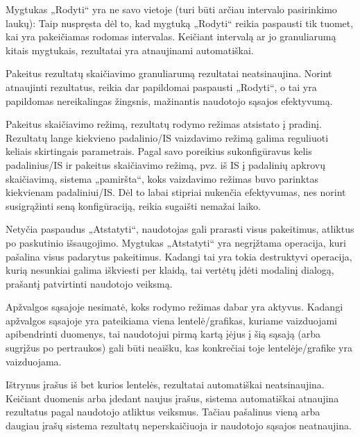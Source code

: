 {
  Mygtukas „Rodyti“ yra ne savo vietoje (turi būti arčiau intervalo
  pasirinkimo laukų):
}
{
  Taip nuspręsta dėl to, kad mygtuką „Rodyti“ reikia paspausti tik tuomet, kai yra
  pakeičiamas rodomas intervalas. Keičiant intervalą ar jo granuliarumą kitais mygtukais,
  rezultatai yra atnaujinami automatiškai.
}

{
  Pakeitus rezultatų skaičiavimo granuliarumą rezultatai neatsinaujina.
}
{
  Norint atnaujinti rezultatus, reikia dar papildomai paspausti „Rodyti“, o tai yra papildomas
  nereikalingas žingsnis, mažinantis naudotojo sąsajos efektyvumą.
}

{
  Pakeitus skaičiavimo režimą, rezultatų rodymo režimas atsistato į pradinį.
}
{
  Rezultatų lange kiekvieno padalinio/IS vaizdavimo režimą galima reguliuoti
  keliais skirtingais parametrais. Pagal savo poreikius sukonfigūravus kelis
  padalinius/IS ir pakeitus skaičiavimo režimą, pvz. iš IS į padalinių
  apkrovų skaičiavimą, sistema „pamiršta“, koks vaizdavimo režimas buvo
  parinktas kiekvienam padaliniui/IS. Dėl to labai stipriai nukenčia
  efektyvumas, nes norint susigrąžinti seną konfigūraciją, reikia sugaišti
  nemažai laiko.
}

{
  Netyčia paspaudus „Atstatyti“, naudotojas gali prarasti visus pakeitimus,
  atliktus po paskutinio išsaugojimo.
}
{
  Mygtukas „Atstatyti“ yra negrįžtama operacija, kuri pašalina visus
  padarytus pakeitimus. Kadangi tai yra tokia destruktyvi operacija, kurią
  nesunkiai galima iškviesti per klaidą, tai vertėtų įdėti modalinį dialogą,
  prašantį patvirtinti naudotojo veiksmą.
}

{
  Apžvalgos sąsajoje nesimatė, koks rodymo režimas dabar yra aktyvus.
}
{
  Kadangi apžvalgos sąsajoje yra pateikiama viena lentelė/grafikas, kuriame
  vaizduojami apibendrinti duomenys, tai naudotojui pirmą kartą įėjus į šią
  sąsają (arba sugrįžus po pertraukos) gali būti neaišku, kas konkrečiai
  toje lentelėje/grafike yra vaizduojama.
}

{
  Ištrynus įrašus iš bet kurios lentelės, rezultatai automatiškai neatsinaujina.
}
{
  Keičiant duomenis arba įdedant naujus įrašus, sistema automatiškai
  atnaujina rezultatus pagal naudotojo atliktus veiksmus. Tačiau pašalinus
  vieną arba daugiau įrašų sistema rezultatų neperskaičiuoja ir naudotojo
  sąsajos neatnaujina.
}

